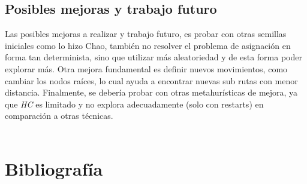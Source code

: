 \documentclass[letter, 10pt]{article}
\begin{document}
\subsection{Posibles mejoras y trabajo futuro}
Las posibles mejoras a realizar y trabajo futuro, es probar con otras semillas iniciales como lo hizo Chao, también no resolver el problema de asignación en forma tan determinista, sino que utilizar más aleatoriedad y de esta forma poder explorar más. Otra mejora fundamental es definir nuevos movimientos, como cambiar los nodos raíces, lo cual ayuda a encontrar nuevas sub rutas con menor distancia. Finalmente, se debería probar con otras metahurísticas de mejora, ya que \textit{HC} es limitado y no explora adecuadamente (solo con restarts) en comparación a otras técnicas.
\\\\
\newpage
\section{Bibliograf\'ia}



\end{document}
